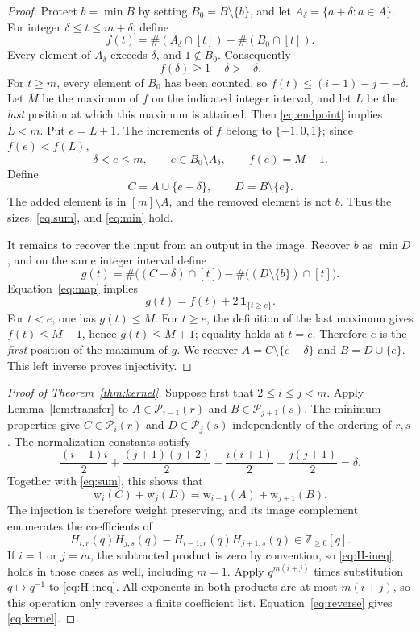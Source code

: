 \documentclass[11pt,a4paper]{article}
\theoremstyle{remark}
\newcommand{\NN}{\mathbb Z_{\geq0}}
\newcommand{\wt}{\mathrm w}
\begin{document}
\begin{proof}
Protect $b=\min B$ by setting $B_0=B\setminus\{b\}$, and let
$A_\delta=\{a+\delta:a\in A\}$. For integer
$\delta\leq t\leq m+\delta$, define
\[
 f(t)=\#(A_\delta\cap[t])-\#(B_0\cap[t]).
\]
Every element of $A_\delta$ exceeds $\delta$, and $1\notin B_0$.
Consequently
\begin{equation}\label{eq:endpoint}
 f(\delta)\geq1-\delta>-\delta.
\end{equation}
For $t\geq m$, every element of $B_0$ has been counted, so
$f(t)\leq(i-1)-j=-\delta$.
Let $M$ be the maximum of $f$ on the indicated integer interval, and
let $L$ be the \emph{last} position at which this maximum is attained.
Then \eqref{eq:endpoint} implies $L<m$. Put $e=L+1$.
The increments of $f$ belong to $\{-1,0,1\}$; since $f(e)<f(L)$,
\[
 \delta<e\leq m,\qquad e\in B_0\setminus A_\delta,
 \qquad f(e)=M-1.
\]
Define
\begin{equation}\label{eq:map}
 C=A\cup\{e-\delta\},\qquad D=B\setminus\{e\}.
\end{equation}
The added element is in $[m]\setminus A$, and the removed element is
not $b$. Thus the sizes, \eqref{eq:sum}, and \eqref{eq:min} hold.

It remains to recover the input from an output in the image.
Recover $b$ as $\min D$, and on the same integer interval define
\[
 g(t)=\#\bigl((C+\delta)\cap[t]\bigr)
       -\#\bigl((D\setminus\{b\})\cap[t]\bigr).
\]
Equation~\eqref{eq:map} implies
\[
 g(t)=f(t)+2\,\mathbf1_{\{t\geq e\}}.
\]
For $t<e$, one has $g(t)\leq M$. For $t\geq e$, the definition of
the last maximum gives $f(t)\leq M-1$, hence $g(t)\leq M+1$;
equality holds at $t=e$. Therefore $e$ is the \emph{first} position
of the maximum of $g$. We recover
$A=C\setminus\{e-\delta\}$ and $B=D\cup\{e\}$.
This left inverse proves injectivity.
\end{proof}

\begin{proof}[Proof of Theorem~\ref{thm:kernel}]
Suppose first that $2\leq i\leq j<m$. Apply Lemma~\ref{lem:transfer}
to $A\in\mathcal P_{i-1}(r)$ and
$B\in\mathcal P_{j+1}(s)$. The minimum properties give
$C\in\mathcal P_i(r)$ and $D\in\mathcal P_j(s)$ independently
of the ordering of $r,s$. The normalization constants satisfy
\[
 \frac{(i-1)i}2+\frac{(j+1)(j+2)}2
 -\frac{i(i+1)}2-\frac{j(j+1)}2=\delta.
\]
Together with \eqref{eq:sum}, this shows that
\[
 \wt_i(C)+\wt_j(D)=\wt_{i-1}(A)+\wt_{j+1}(B).
\]
The injection is therefore weight preserving, and its image complement
enumerates the coefficients of
\begin{equation}\label{eq:H-ineq}
 H_{i,r}(q)H_{j,s}(q)-H_{i-1,r}(q)H_{j+1,s}(q)\in\NN[q].
\end{equation}
If $i=1$ or $j=m$, the subtracted product is zero by convention,
so \eqref{eq:H-ineq} holds in those cases as well, including $m=1$.
Apply $q^{m(i+j)}$ times substitution $q\mapsto q^{-1}$ to
\eqref{eq:H-ineq}. All exponents in both products are at most
$m(i+j)$, so this operation only reverses a finite coefficient list.
Equation~\eqref{eq:reverse} gives \eqref{eq:kernel}.
\end{proof}
\end{document}
